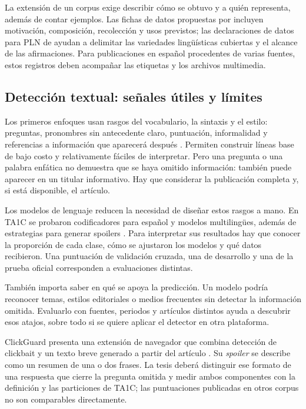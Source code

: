 La extensión de un corpus exige describir cómo se obtuvo y a quién representa, además de contar ejemplos. Las fichas de datos propuestas por \citet{gebru2021datasheets} incluyen motivación, composición, recolección y usos previstos; las declaraciones de datos para PLN de \citet{bender2018datastatements} ayudan a delimitar las variedades lingüísticas cubiertas y el alcance de las afirmaciones. Para publicaciones en español procedentes de varias fuentes, estos registros deben acompañar las etiquetas y los archivos multimedia.

\subsection{Detección textual: señales útiles y límites}
\label{sec:texto}

Los primeros enfoques usan rasgos del vocabulario, la sintaxis y el estilo: preguntas, pronombres sin antecedente claro, puntuación, informalidad y referencias a información que aparecerá después \citep{biyani2016,potthast2018}. Permiten construir líneas base de bajo costo y relativamente fáciles de interpretar. Pero una pregunta o una palabra enfática no demuestra que se haya omitido información: también puede aparecer en un titular informativo. Hay que considerar la publicación completa y, si está disponible, el artículo.

Los modelos de lenguaje reducen la necesidad de diseñar estos rasgos a mano. En TA1C se probaron codificadores para español y modelos multilingües, además de estrategias para generar spoilers \citep{ta1c2025,fing2025}. Para interpretar sus resultados hay que conocer la proporción de cada clase, cómo se ajustaron los modelos y qué datos recibieron. Una puntuación de validación cruzada, una de desarrollo y una de la prueba oficial corresponden a evaluaciones distintas.

También importa saber en qué se apoya la predicción. Un modelo podría reconocer temas, estilos editoriales o medios frecuentes sin detectar la información omitida. Evaluarlo con fuentes, periodos y artículos distintos ayuda a descubrir esos atajos, sobre todo si se quiere aplicar el detector en otra plataforma.

ClickGuard presenta una extensión de navegador que combina detección de clickbait y un texto breve generado a partir del artículo \citep{michaluk2026clickguard}. Su \emph{spoiler} se describe como un resumen de una o dos frases. La tesis deberá distinguir ese formato de una respuesta que cierre la pregunta omitida y medir ambos componentes con la definición y las particiones de TA1C; las puntuaciones publicadas en otros corpus no son comparables directamente.

